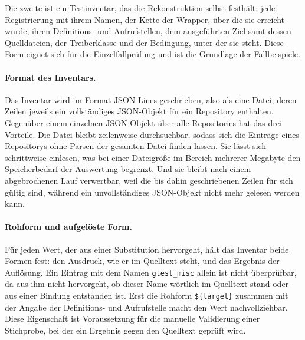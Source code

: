 \documentclass[12pt,a4paper,twoside,headsepline,parskip=half]{scrreprt}
\begin{document}
Die zweite ist ein Testinventar, das die Rekonstruktion selbst festhält: jede
Registrierung mit ihrem Namen, der Kette der Wrapper, über die sie erreicht wurde,
ihren Definitions- und Aufrufstellen, dem ausgeführten Ziel samt dessen Quelldateien,
der Treiberklasse und der Bedingung, unter der sie steht. Diese Form eignet sich für
die Einzelfallprüfung und ist die Grundlage der Fallbeispiele.

\paragraph{Format des Inventars.}
Das Inventar wird im Format JSON Lines geschrieben, also als eine Datei, deren Zeilen
jeweils ein vollständiges JSON-Objekt für ein Repository enthalten. Gegenüber einem
einzelnen JSON-Objekt über alle Repositories hat das drei Vorteile. Die Datei bleibt
zeilenweise durchsuchbar, sodass sich die Einträge eines Repositorys ohne Parsen der
gesamten Datei finden lassen. Sie lässt sich schrittweise einlesen, was bei einer
Dateigröße im Bereich mehrerer Megabyte den Speicherbedarf der Auswertung begrenzt.
Und sie bleibt nach einem abgebrochenen Lauf verwertbar, weil die bis dahin
geschriebenen Zeilen für sich gültig sind, während ein unvollständiges JSON-Objekt
nicht mehr gelesen werden kann.

\paragraph{Rohform und aufgelöste Form.}
Für jeden Wert, der aus einer Substitution hervorgeht, hält das Inventar beide Formen
fest: den Ausdruck, wie er im Quelltext steht, und das Ergebnis der Auflösung. Ein
Eintrag mit dem Namen \texttt{gtest\_misc} allein ist nicht überprüfbar, da aus ihm
nicht hervorgeht, ob dieser Name wörtlich im Quelltext stand oder aus einer Bindung
entstanden ist. Erst die Rohform \texttt{\$\{target\}} zusammen mit der Angabe der
Definitions- und Aufrufstelle macht den Wert nachvollziehbar. Diese Eigenschaft ist
Voraussetzung für die manuelle Validierung einer Stichprobe, bei der ein Ergebnis
gegen den Quelltext geprüft wird.
\end{document}
